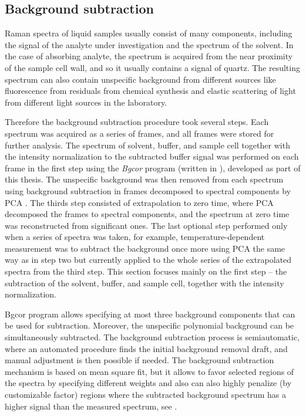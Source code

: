 \subsection{Background subtraction}
\label{background}

Raman spectra of liquid samples usually consist of many components, including
the signal of the analyte under investigation and the spectrum of the solvent.
In the case of absorbing analyte, the spectrum
is acquired from the near proximity of the sample cell wall, and so it
usually contains a signal of quartz.
The resulting spectrum can also contain unspecific background from different
sources like fluorescence from residuals from chemical synthesis and elastic
scattering of light from different light sources in the laboratory.

Therefore the background subtraction procedure took several steps.
Each spectrum was acquired as a series of frames, and all frames were stored
for further analysis.
The spectrum of solvent, buffer, and sample cell together with the intensity
normalization to the subtracted buffer signal was performed on each frame in
the first step using the \emph{Bgcor} program
\parencite{Bgcor2017}
(written in \cite{Matlab}),
developed as part of this thesis. The unspecific background was then removed
from each spectrum using background subtraction in frames decomposed to
spectral components by PCA
\parencite{Palacky2011}.
The thirds step consisted of extrapolation to zero time, where PCA decomposed
the frames to spectral components, and the spectrum at zero time
was reconstructed from significant ones.
The last optional step performed only when a series of spectra was
taken, for example, temperature-dependent measurement was to subtract the
background once more using PCA the same way as in step two but currently
applied to the whole series of the extrapolated spectra from the third step.
This section focuses mainly on the first step -- the subtraction of the
solvent, buffer, and sample cell, together with the intensity normalization.

Bgcor program allows specifying at most three background components that can
be used for subtraction.
Moreover, the unspecific polynomial background can be
simultaneously subtracted.
The background subtraction process is semiautomatic, where an automated
procedure finds the initial background removal draft, and manual adjustment
is then possible if needed.
The background subtraction mechanism is based on mean square fit, but it allows
to favor selected regions of the spectra by specifying different weights and
also can also highly penalize (by customizable factor) regions where the
subtracted background spectrum has a higher signal than the measured spectrum,
see
.

